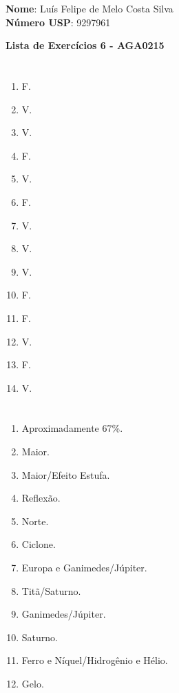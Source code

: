 \documentclass[12pt,letterpaper]{article}
\begin{document}
	
	\large \textbf{Nome}: Luís Felipe de Melo Costa Silva \\
	\textbf{Número USP}: 9297961 
    
	\begin{center}
		\LARGE \bf
		Lista de Exercícios 6 - AGA0215
	\end{center}
	
	\part{}
	
	\begin{multicols}{7}
		\begin{enumerate}
			\item F.
			\item V.
			\item V.
			\item F.
			\item V.
			\item F.
			\item V.
			\item V.
			\item V.
			\item F.
			\item F.
			\item V.
		    \item F.
		    \item V.
		\end{enumerate}
	\end{multicols}
	
	\part{}
		\begin{multicols}{2}
			\begin{enumerate}
				\item Aproximadamente 67\%.
				\item Maior.
				\item Maior/Efeito Estufa.
				\item Reflexão.
				\item Norte.
				\item Ciclone.
				\item Europa e Ganimedes/Júpiter.
				\item Titã/Saturno.
				\item Ganimedes/Júpiter.
				\item Saturno.
				\item Ferro e Níquel/Hidrogênio e Hélio.
				\item Gelo.
			\end{enumerate}
		\end{multicols}
	
\end{document}

